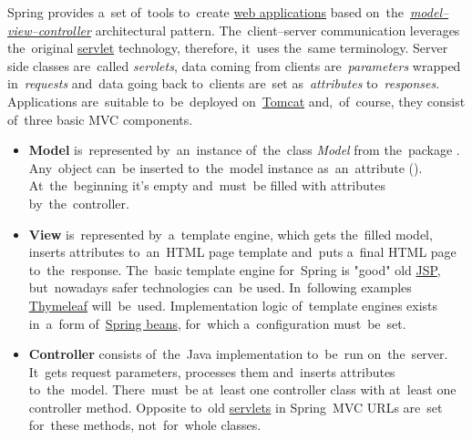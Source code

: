 
Spring provides a~set of~tools to~create \hyperref[webserviceapplication]{web applications} based on~the~\hyperref[mvc]{\textit{model--view--controller}} architectural pattern.
The~client--server communication leverages the~original \hyperref[servlet]{servlet} technology, therefore, it~uses the~same terminology.
Server side classes are~called \textit{servlets}, data coming from clients are~\textit{parameters} wrapped in~\textit{requests} and~data going back to~clients are~set as~\textit{attributes} to~\textit{responses}.
Applications are~suitable to~be~deployed on~\hyperref[tomcat]{Tomcat} and,~of~course, they consist of~three basic MVC components.

\begin{itemize}
    \item \textbf{Model} is~represented by~an~instance of~the~class \textit{Model} from the~package . Any~object can~be inserted to~the~model instance as~an~attribute ().
    At~the~beginning it's empty and~must~be filled with attributes by~the~controller.
    \item \textbf{View} is~represented by~a~template engine, which gets the~filled model, inserts attributes to~an~HTML page template and~puts a~final HTML page to~the~response.
    The~basic template engine for~Spring is "good" old \hyperref[jsp]{JSP}, but~nowadays safer technologies can~be used.
    In~following examples \href{https://www.thymeleaf.org/}{Thymeleaf} will~be~used.
    Implementation logic of~template engines exists in~a~form of~\hyperref[springinversionofcontrol]{Spring beans}, for~which a~configuration must~be~set.
    \item \textbf{Controller} consists of~the~Java implementation to~be~run on~the~server.
    It~gets request parameters, processes them and~inserts attributes to~the~model.
    There~must~be at~least one controller class with at~least one controller method.
    Opposite to~old \hyperref[servlet]{servlets} in Spring~MVC URLs are~set for~these methods, not~for~whole classes.
\end{itemize}
\newpage

\newpage
